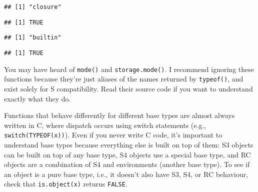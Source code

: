 \begin{Shaded}
\begin{Highlighting}[]
\StringTok{ }\NormalTok{() \{\}}
\end{Highlighting}
\end{Shaded}

\begin{verbatim}
## [1] "closure"
\end{verbatim}

\begin{Shaded}
\begin{Highlighting}[]
\end{Highlighting}
\end{Shaded}

\begin{verbatim}
## [1] TRUE
\end{verbatim}

\begin{Shaded}
\begin{Highlighting}[]
\end{Highlighting}
\end{Shaded}

\begin{verbatim}
## [1] "builtin"
\end{verbatim}

\begin{Shaded}
\begin{Highlighting}[]
\end{Highlighting}
\end{Shaded}

\begin{verbatim}
## [1] TRUE
\end{verbatim}

You may have heard of \texttt{mode()} and \texttt{storage.mode()}. I
recommend ignoring these functions because they're just aliases of the
names returned by \texttt{typeof()}, and exist solely for S
compatibility. Read their source code if you want to understand exactly
what they do. 

Functions that behave differently for different base types are almost
always written in C, where dispatch occurs using switch statements
(e.g., \texttt{switch(TYPEOF(x))}). Even if you never write C code, it's
important to understand base types because everything else is built on
top of them: S3 objects can be built on top of any base type, S4 objects
use a special base type, and RC objects are a combination of S4 and
environments (another base type). To see if an object is a pure base
type, i.e., it doesn't also have S3, S4, or RC behaviour, check that
\texttt{is.object(x)} returns \texttt{FALSE}.

